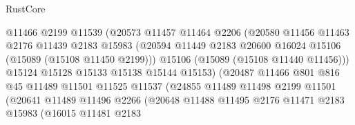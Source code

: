 \begin{lexlean}{RustCore}
\begin{coremodule}
                                  @11466
                                  @2199
                                  @11539
                                  (@20573
                                    @11457
                                    @11464
                                    @2206
                                    (@20580
                                      @11456
                                      @11463
                                      @2176
                                      @11439
                                      @2183
                                      @15983
                                      (@20594
                                        @11449
                                        @2183
                                        @20600
                                        @16024
                                        @15106
                                        (@15089 (@15108 @11450 @2199)))
                                      @15106
                                      (@15089 (@15108 @11440 @11456)))
                                    @15124
                                    @15128
                                    @15133
                                    @15138
                                    @15144
                                    @15153)
                                  (@20487
                                    @11466
                                    @801
                                    @816
                                    @45
                                    @11489
                                    @11501
                                    @11525
                                    @11537
                                    (@24855
                                      @11489
                                      @11498
                                      @2199
                                      @11501
                                      (@20641
                                        @11489
                                        @11496
                                        @2266
                                        (@20648
                                          @11488
                                          @11495
                                          @2176
                                          @11471
                                          @2183
                                          @15983
                                          (@16015
                                            @11481
                                            @2183

\end{coremodule}
\end{lexlean}
